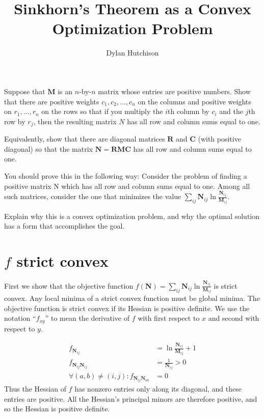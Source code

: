 \documentclass[10pt,a4paper]{article}
\author{Dylan Hutchison}
\title{Sinkhorn's Theorem as a Convex Optimization Problem}
\newcommand{\matr}[1]{\mathbf{#1}} %
\begin{document}
\maketitle

Suppose that $\matr{M}$ is an $n$-by-$n$ matrix whose entries are positive numbers.  Show that there are positive weights $c_1, c_2, ..., c_n$ on the columns and positive weights on $r_1, ..., r_n$ on the rows so that if you multiply the $i$th column by $c_i$ and the $j$th row by $r_j$, then the resulting matrix $N$ has all row and column sums equal to one.

Equivalently, show that there are diagonal matrices $\matr{R}$ and $\matr{C}$ (with positive diagonal) so that the matrix $\matr{N}=\matr{R} \matr{M} \matr{C}$ has all row and column sums equal to one.

You should prove this in the following way:  Consider the problem of finding a positive matrix N which has all row and column sums equal to one.  Among all such matrices, consider the one that minimizes the value $\sum_{ij} \matr{N}_{ij} \ln \frac{\matr{N}_{ij}}{\matr{M}_{ij}}$.

Explain why this is a convex optimization problem, and why the optimal solution has a form that accomplishes the goal.

\section{$f$ strict convex}
First we show that the objective function $f(\matr{N}) = \sum_{ij} \matr{N}_{ij} \ln \frac{\matr{N}_{ij}}{\matr{M}_{ij}}$ 
is strict convex. Any local minima of a strict convex function must be global minima.
The objective function is strict convex if its Hessian is positive definite.
We use the notation ``$f_{xy}$'' to mean the derivative of $f$ with first respect to $x$ and 
second with respect to $y$.

\begin{align*}
f_{\matr{N}_{ij}} &= \ln{\frac{\matr{N}_{ij}}{\matr{M}_{ij}}} + 1 \\
f_{\matr{N}_{ij}\matr{N}_{ij}} &= \frac{1}{\matr{N}_{ij}} > 0\\
\forall (a,b) \neq (i,j): f_{\matr{N}_{ij}\matr{N}_{ab}} &= 0
\end{align*}
Thus the Hessian of $f$ has nonzero entries only along its diagonal, and these entries are positive.
All the Hessian's principal minors are therefore positive, and so the Hessian is positive definite.
\end{document}
